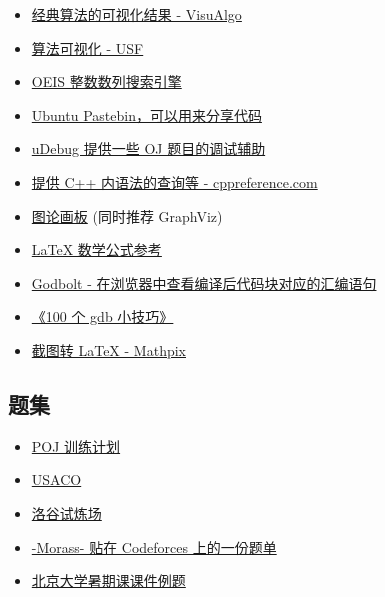 \begin{itemize}
\item \href{https://visualgo.net/en}{经典算法的可视化结果 - VisuAlgo}
\item \href{https://www.cs.usfca.edu/~galles/visualization/}{算法可视化 - USF}
\item \href{https://oeis.org}{OEIS 整数数列搜索引擎}
\item \href{https://paste.ubuntu.com}{Ubuntu Pastebin，可以用来分享代码}
\item \href{https://www.udebug.com}{uDebug 提供一些 OJ 题目的调试辅助}
\item \href{https://zh.cppreference.com/w/}{提供 C++ 内语法的查询等 - cppreference.com}
\item \href{https://csacademy.com/app/graph_editor/}{图论画板} (同时推荐 GraphViz)
\item \href{http://www.mohu.org/info/symbols/symbols.htm}{LaTeX 数学公式参考}
\item \href{https://godbolt.org/}{Godbolt - 在浏览器中查看编译后代码块对应的汇编语句}
\item \href{https://github.com/hellogcc/100-gdb-tips}{《100 个 gdb 小技巧》}
\item \href{https://mathpix.com/}{截图转 LaTeX - Mathpix}
\end{itemize}

\subsection{题集}

\begin{itemize}
\item \href{http://blog.csdn.net/skywalkert/article/details/46594541}{POJ 训练计划}
\item \href{http://train.usaco.org/usacogate}{USACO}
\item \href{https://www.luogu.org/training/mainpage}{洛谷试炼场}
\item \href{https://codeforces.com/blog/entry/55274}{-Morass- 贴在 Codeforces 上的一份题单}
\item \href{https://vjudge.net/article/446}{北京大学暑期课课件例题}
\end{itemize}
